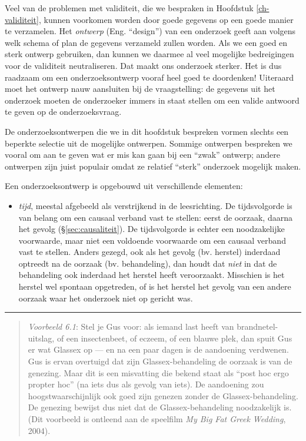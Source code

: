 \documentclass[
]{book}
\providecommand{\tightlist}{%
  \setlength{\itemsep}{0pt}\setlength{\parskip}{0pt}}
\begin{document}
Veel van de problemen met validiteit, die we bespraken in
Hoofdstuk \ref{ch-validiteit}, kunnen voorkomen worden door goede gegevens
op een goede manier te verzamelen. Het \emph{ontwerp} (Eng. ``design'') van een
onderzoek geeft aan volgens welk schema of plan de gegevens verzameld
zullen worden. Als we een goed en sterk ontwerp gebruiken, dan kunnen we
daarmee al veel mogelijke bedreigingen voor de validiteit neutraliseren.
Dat maakt ons onderzoek sterker. Het is dus raadzaam om een
onderzoeksontwerp vooraf heel goed te doordenken! Uiteraard moet het
ontwerp nauw aansluiten bij de vraagstelling: de gegevens uit het
onderzoek moeten de onderzoeker immers in staat stellen om een valide
antwoord te geven op de onderzoeksvraag.

De onderzoeksontwerpen die we in dit hoofdstuk bespreken vormen slechts
een beperkte selectie uit de mogelijke ontwerpen. Sommige ontwerpen
bespreken we vooral om aan te geven wat er mis kan gaan bij een ``zwak''
ontwerp; andere ontwerpen zijn juist populair omdat ze relatief ``sterk''
onderzoek mogelijk maken.

Een onderzoeksontwerp is opgebouwd uit verschillende elementen:

\begin{itemize}
\tightlist
\item
  \emph{tijd}, meestal afgebeeld als verstrijkend in de leesrichting. De
  tijdsvolgorde is van belang om een causaal verband vast te stellen:
  eerst de oorzaak, daarna het gevolg
  (§\ref{sec:causaliteit}). De tijdsvolgorde is echter een
  noodzakelijke voorwaarde, maar niet een voldoende voorwaarde om een
  causaal verband vast te stellen. Anders gezegd, ook als het gevolg
  (bv. herstel) inderdaad optreedt na de oorzaak (bv. behandeling),
  dan houdt dat \emph{niet} in dat de behandeling ook inderdaad het herstel
  heeft veroorzaakt. Misschien is het herstel wel spontaan opgetreden,
  of is het herstel het gevolg van een andere oorzaak waar het
  onderzoek niet op gericht was.
\end{itemize}

\begin{center}\rule{0.5\linewidth}{0.5pt}\end{center}

\begin{quote}
\emph{Voorbeeld 6.1}: Stel je Gus voor: als iemand last heeft van brandnetel-uitslag, of een insectenbeet, of eczeem, of een blauwe plek, dan spuit Gus er wat Glassex op --- en na een paar dagen is de aandoening verdwenen. Gus is ervan overtuigd dat zijn Glassex-behandeling de oorzaak is van de genezing. Maar dit is een misvatting die bekend staat als ``post hoc ergo propter hoc'' (na iets dus als gevolg van iets). De aandoening zou hoogstwaarschijnlijk ook goed zijn genezen zonder de Glassex-behandeling. De genezing bewijst dus niet dat de Glassex-behandeling noodzakelijk is. (Dit voorbeeld is ontleend aan de speelfilm \emph{My Big Fat Greek Wedding}, 2004).
\end{quote}
\end{document}
